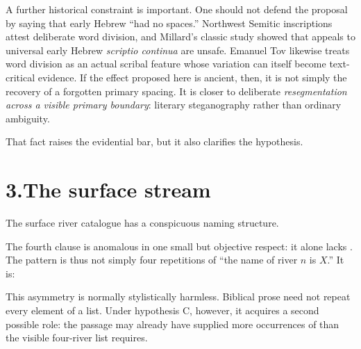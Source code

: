 A further historical constraint is important.  One should not defend the proposal by saying that early Hebrew ``had no spaces.''  Northwest Semitic inscriptions attest deliberate word division, and Millard's classic study showed that appeals to universal early Hebrew \textit{scriptio continua} are unsafe.\cite{Millard1970}  Emanuel Tov likewise treats word division as an actual scribal feature whose variation can itself become text-critical evidence.\cite{Tov2012}  If the effect proposed here is ancient, then, it is not simply the recovery of a forgotten primary spacing.  It is closer to deliberate \emph{resegmentation across a visible primary boundary}: literary steganography rather than ordinary ambiguity.

That fact raises the evidential bar, but it also clarifies the hypothesis.

\section*{3.\quad The surface stream}

The surface river catalogue has a conspicuous naming structure.


The fourth clause is anomalous in one small but objective respect: it alone lacks .  The pattern is thus not simply four repetitions of ``the name of river $n$ is $X$.''  It is:


This asymmetry is normally stylistically harmless.  Biblical prose need not repeat every element of a list.  Under hypothesis C, however, it acquires a second possible role: the passage may already have supplied more occurrences of  than the visible four-river list requires.


